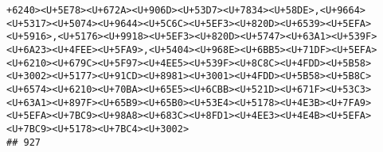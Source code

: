 \documentclass[
]{article}
\begin{document}
\begin{verbatim}
+6240><U+5E78><U+672A><U+906D><U+53D7><U+7834><U+58DE>,<U+9664><U+5317><U+5074><U+9644><U+5C6C><U+5EF3><U+820D><U+6539><U+5EFA><U+5916>,<U+5176><U+9918><U+5EF3><U+820D><U+5747><U+63A1><U+539F><U+6A23><U+4FEE><U+5FA9>,<U+5404><U+968E><U+6BB5><U+71DF><U+5EFA><U+6210><U+679C><U+5F97><U+4EE5><U+539F><U+8C8C><U+4FDD><U+5B58><U+3002><U+5177><U+91CD><U+8981><U+3001><U+4FDD><U+5B58><U+5B8C><U+6574><U+6210><U+70BA><U+65E5><U+6CBB><U+521D><U+671F><U+53C3><U+63A1><U+897F><U+65B9><U+65B0><U+53E4><U+5178><U+4E3B><U+7FA9><U+5EFA><U+7BC9><U+98A8><U+683C><U+8FD1><U+4EE3><U+4E4B><U+5EFA><U+7BC9><U+5178><U+7BC4><U+3002>
## 927                                                                                                                                                                                                                                                                                                                                                                                                                                                                                                                                                                                                                                                                                                                                                                                                                                                                                                                                                                                                                                                                                                                                                                                                                                                                                                                                                                                                                                                                                                                                                                                                                                                                                                                                                                                                                                                                                                                                                                                                                                                                                                                                                                                                                                                                                                                                                                                                                                                                                                                                                                                                                                                                                                                                                                                                               
\end{verbatim}
\end{document}
